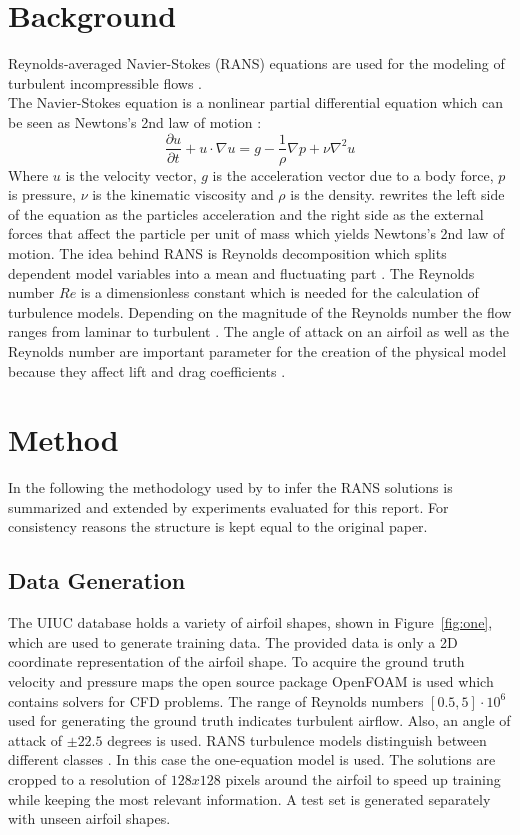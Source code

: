 \documentclass[acmtog]{techreportacmart}
\begin{document}
\section{Background}
Reynolds-averaged Navier-Stokes (RANS) equations are used for the modeling of turbulent incompressible flows \cite{Alfonsi}. \\
The Navier-Stokes equation is a nonlinear partial differential equation which can be seen as Newtons's 2nd law of motion \cite{BISTAFA2018}:
\begin{equation}
\label{eqn:01}
\frac{\partial{u}}{\partial{t}} + u \cdot \nabla u = g - \frac{1}{\rho} \nabla p + \nu \nabla^{2}u
\end{equation}
Where $u$ is the velocity vector, $g$ is the acceleration vector due to a body force, $p$ is pressure, 
$\nu$ is the kinematic viscosity and $\rho$ is the density. \cite{BISTAFA2018} rewrites the left side of the equation as the particles acceleration and the right side as the external forces that affect the particle per unit of mass which yields Newtons's 2nd law of motion. The idea behind RANS is Reynolds decomposition which splits dependent model variables into a mean and fluctuating part \cite{Alfonsi}. The Reynolds number $Re$ is a dimensionless constant which is needed for the calculation of turbulence models. Depending on the magnitude of the Reynolds number the flow ranges from laminar to turbulent \cite{lissaman1983}. The angle of attack on an airfoil as well as the Reynolds number are important parameter for the creation of the physical model because they affect lift and drag coefficients \cite{lissaman1983}. 

\section{Method}
In the following the methodology used by \cite{Thuerey20} to infer the RANS solutions is summarized and extended by experiments evaluated for this report. For consistency reasons the structure is kept equal to the original paper.

\subsection{Data Generation}
The UIUC database \cite{airfoil} holds a variety of airfoil shapes, shown in Figure~\ref{fig:one}, which are used to generate training data. The provided data is only a 2D coordinate representation of the airfoil shape. To acquire the ground truth velocity and pressure maps the open source package OpenFOAM is used which contains solvers for CFD problems. The range of Reynolds numbers $[0.5, 5] \cdot 10^{6}$ used for generating the ground truth indicates turbulent airflow. Also, an angle of attack of $\pm 22.5$ degrees is used. RANS turbulence models distinguish between different classes \cite{Alfonsi}. In this case the one-equation model is used. The solutions are cropped to a resolution of $128x128$ pixels around the airfoil to speed up training while keeping the most relevant information. A test set is generated separately with unseen airfoil shapes.
\end{document}
